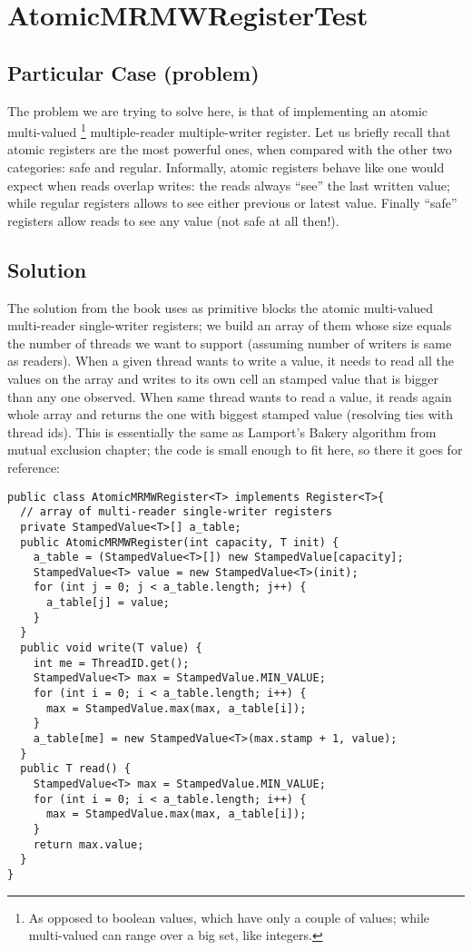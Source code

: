 \section{\textbf{AtomicMRMWRegisterTest}}

\subsection{Particular Case (problem)}
The problem we are trying to solve here, is that of implementing an
atomic multi-valued \footnote{As opposed to boolean values, which have
only a couple of values; while multi-valued can range over a big set,
like integers.}
multiple-reader multiple-writer register. Let us 
briefly recall that atomic registers are the most powerful ones, when
compared with the 
other two categories: safe and regular. Informally, atomic registers
behave like one would expect when reads overlap writes: the reads
always ``see'' the last written value; while regular registers allows
to see either previous or latest value. Finally ``safe'' registers
allow reads to see any value (not safe at all then!). 

\subsection{Solution}
The solution from the book uses as primitive blocks the atomic
multi-valued multi-reader single-writer registers; we build an array of them whose
size equals the number of threads we want to support (assuming number
of writers is same as readers). When a given thread  wants to
write a value, it needs to read all the values on the array and writes
to its own cell an stamped value that is bigger than any one
observed. When same thread wants to read a value, it reads again whole
array and returns the one with biggest stamped value (resolving ties
with thread ids). This is essentially the same as Lamport's Bakery
algorithm from mutual exclusion chapter; the code is small enough to
fit here, so there it goes for reference: \\

\newpage
\begin{lstlisting}[style=numbers]
public class AtomicMRMWRegister<T> implements Register<T>{
  // array of multi-reader single-writer registers
  private StampedValue<T>[] a_table; 
  public AtomicMRMWRegister(int capacity, T init) {
    a_table = (StampedValue<T>[]) new StampedValue[capacity];
    StampedValue<T> value = new StampedValue<T>(init);
    for (int j = 0; j < a_table.length; j++) {
      a_table[j] = value;
    }
  }
  public void write(T value) {
    int me = ThreadID.get();
    StampedValue<T> max = StampedValue.MIN_VALUE;
    for (int i = 0; i < a_table.length; i++) {
      max = StampedValue.max(max, a_table[i]);
    }
    a_table[me] = new StampedValue<T>(max.stamp + 1, value);
  }
  public T read() {
    StampedValue<T> max = StampedValue.MIN_VALUE;
    for (int i = 0; i < a_table.length; i++) {
      max = StampedValue.max(max, a_table[i]);
    }
    return max.value;
  }
}
\end{lstlisting}

